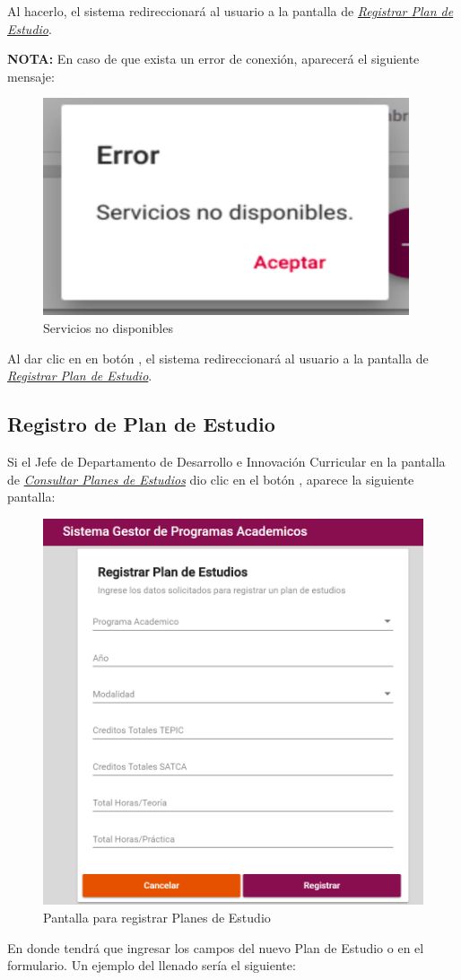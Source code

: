 Al hacerlo, el sistema redireccionará al usuario a la pantalla de \hyperlink{registrarPE}{\textit{Registrar Plan de Estudio}}.


\textbf{NOTA:} En caso de que exista un error de conexión, aparecerá el siguiente mensaje:
	\begin{figure}[!hbtp]
	\centering
	\hypertarget{error}{\includegraphics[width=0.7\linewidth]{images/SP4-GPE/error}}
	\caption{Servicios no disponibles}
	\label{error}
\end{figure}

Al dar clic en en botón , el sistema redireccionará al usuario a la pantalla de \hyperlink{registrarPE}{\textit{Registrar Plan de Estudio}}. 
\newpage
\subsection{Registro de Plan de Estudio}
Si el Jefe de Departamento de Desarrollo e Innovación Curricular en la pantalla de \hyperlink{consultarPE}{\textit{Consultar Planes de Estudios}} dio clic en el botón \IUbutton{+}, aparece la siguiente pantalla:

\begin{figure}[!hbtp]
	\centering
	\hypertarget{registrarPE}{\includegraphics[width=0.7\linewidth]{images/SP4-GPE/registrarPE}}
	\caption{Pantalla para registrar Planes de Estudio}
	\label{registrarPE}
\end{figure}
\newpage
En donde tendrá que ingresar los campos del nuevo Plan de Estudio o en el formulario. Un ejemplo del llenado sería el siguiente:

